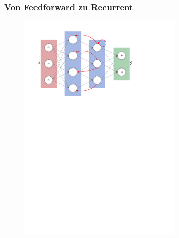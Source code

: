 \documentclass[german,aspectratio=169]{beamer}
\begin{document}
\begin{frame}
	\frametitle{Von Feedforward zu Recurrent}
	\begin{figure}
		\includegraphics[width=0.7\textwidth]{rnn}
	\end{figure}
\end{frame}
\end{document}
